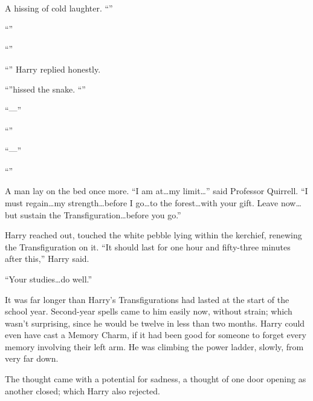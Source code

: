 A hissing of cold laughter. “”

“”

“”

“” Harry replied honestly.

“”hissed the snake. “”

“—”

“”

“—”

“”

A man lay on the bed once more. “I am at…my limit…” said
Professor Quirrell. “I must regain…my strength…before I
go…to the forest…with your gift. Leave now…but sustain
the Transfiguration…before you go.”

Harry reached out, touched the white pebble lying within the kerchief, renewing the Transfiguration on it. “It should last for one hour and fifty-three minutes after this,” Harry said.

“Your studies…do well.”

It was far longer than Harry’s Transfigurations had lasted at the start of the school year. Second-year spells came to him easily now, without strain; which wasn’t surprising, since he would be twelve in less than two months. Harry could even have cast a Memory Charm, if it had been good for someone to forget every memory involving their left arm. He was climbing the power ladder, slowly, from very far down.

The thought came with a potential for sadness, a thought of one door opening as another closed; which Harry also rejected.

